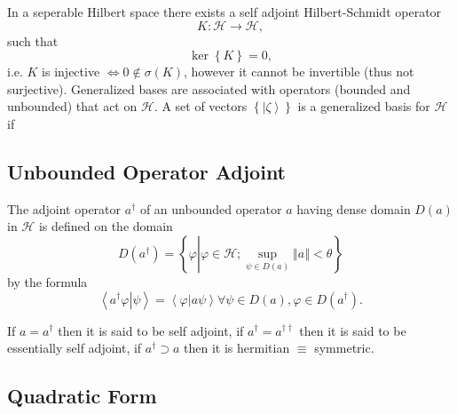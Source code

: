 \documentclass[aps,preprint]{revtex4}%
\begin{document}
In a seperable Hilbert space there exists a self adjoint Hilbert-Schmidt
operator
\[
K:\mathcal{H\longrightarrow H},
\]
such that
\[
\ker\left\{  K\right\}  =0,
\]
i.e. $K$ is injective $\Longleftrightarrow0\notin\sigma\left(  K\right)  $,
however it cannot be invertible (thus not surjective). Generalized bases are
associated with operators (bounded and unbounded) that act on $\mathcal{H}$. A
set of vectors $\left\{  \left\vert \zeta\right\rangle \right\}  $ is a
generalized basis for $\mathcal{H}$ if

\subsection{Unbounded Operator Adjoint}

The adjoint operator $a^{\dagger}$ of an unbounded operator $a$ having dense
domain $D\left(  a\right)  $ in $\mathcal{H}$ is defined on the domain
\[
D\left(  a^{\dagger}\right)  =\left\{  \varphi\left\vert \varphi\in
\mathcal{H};\sup_{\psi\in D\left(  a\right)  }\left\Vert a\right\Vert
<\theta\right.  \right\}
\]
by the formula%
\[
\left\langle \left.  a^{\dagger}\varphi\right\vert \psi\right\rangle
=\left\langle \left.  \varphi\right\vert a\psi\right\rangle \forall\psi\in
D\left(  a\right)  ,\varphi\in D\left(  a^{\dagger}\right)  .
\]


If $a=a^{\dagger}$ then it is said to be self adjoint, if $a^{\dagger
}=a^{\dagger\dagger}$ then it is said to be essentially self adjoint, if
$a^{\dagger}\supset a$ then it is hermitian $\equiv$ symmetric.

\subsection{Quadratic Form}
\end{document}
